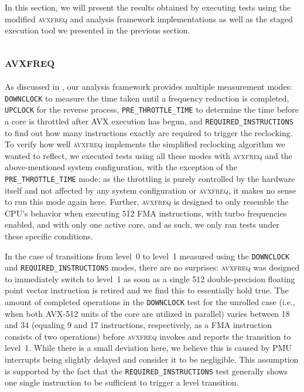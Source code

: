 In this section, we will present the results obtained by executing tests using the modified \textsc{avxfreq} and analysis framework implementations as well as the staged execution tool we presented in the previous section.

\subsection{\textsc{avxfreq}}
\label{sec:evaluation:results:avxfreq}

As discussed in , our analysis framework provides multiple measurement modes: \texttt{DOWNCLOCK} to measure the time taken until a frequency reduction is completed, \texttt{UPCLOCK} for the reverse process, \texttt{PRE\_THROTTLE\_TIME} to determine the time before a core is throttled after \gls{AVX} execution has begun, and \texttt{REQUIRED\_INSTRUCTIONS} to find out how many instructions exactly are required to trigger the reclocking. To verify how well \textsc{avxfreq} implements the simplified reclocking algorithm we wanted to reflect, we executed tests using all these modes with \textsc{avxfreq} and the above-mentioned system configuration, with the exception of the \texttt{PRE\_THROTTLE\_TIME} mode: as the throttling is purely controlled by the hardware itself and not affected by any system configuration or \textsc{avxfreq}, it makes no sense to run this mode again here. Further, \textsc{avxfreq} is designed to only resemble the \gls{CPU}'s behavior when executing \SI{512}{\bit} \gls{FMA} instructions, with turbo frequencies enabled, and with only one active core, and as such, we only ran tests under these specific conditions.

In the case of transitions from level~0 to level~1 measured using the \texttt{DOWNCLOCK} and \texttt{REQUIRED\_INSTRUCTIONS} modes, there are no surprises: \textsc{avxfreq} was designed to immediately switch to level~1 as soon as a single \SI{512}{\bit} double-precision floating point vector instruction is retired and we find this to essentially hold true. The amount of completed operations in the \texttt{DOWNCLOCK} test for the unrolled case (i.e., when both \gls{AVX-512} units of the core are utilized in parallel) varies between 18 and 34 (equaling 9 and 17 instructions, respectively, as a \gls{FMA} instruction consists of two operations) before \textsc{avxfreq} invokes and reports the transition to level~1. While there is a small deviation here, we believe this is caused by \gls{PMU} interrupts being slightly delayed and consider it to be negligible. This assumption is supported by the fact that the \texttt{REQUIRED\_INSTRUCTIONS} test generally shows one single instruction to be sufficient to trigger a level transition.

